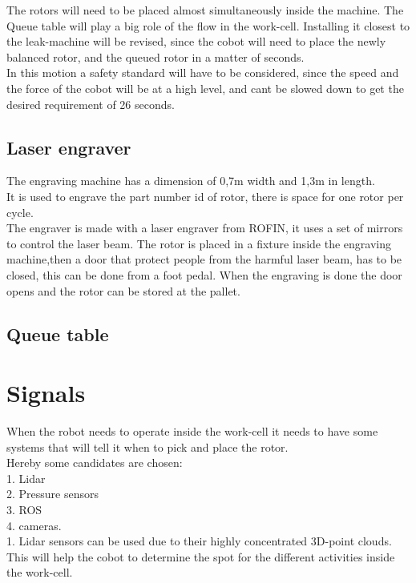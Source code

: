  The rotors will need to be placed almost simultaneously inside the machine. The Queue table will play a big role of the flow in the work-cell. Installing it closest to the leak-machine will be revised, since the cobot will need to place the newly balanced rotor, and the queued rotor in a matter of seconds.\\ 
 In this motion a safety standard will have to be considered, since the speed and the force of the cobot will be at a high level, and cant be slowed down to get the desired requirement of 26 seconds.\\
 
 \subsection{Laser engraver}
 The engraving machine has a dimension of 0,7m width and 1,3m in length.\\
 It is used to engrave the part number id of rotor, there is space for one rotor per cycle.\\
 The engraver is made with a laser engraver from ROFIN, it uses a set of mirrors to control the laser beam\cite{laser}. The rotor is placed in a fixture inside the engraving machine,then a door that protect people from the harmful laser beam, has to be closed, this can be done from a foot pedal. When the engraving is done the door opens and the rotor can be stored at the pallet.   
 \subsection{Queue table}
 
 \section{Signals}
 
 When the robot needs to operate inside the work-cell it needs to have some systems that will tell it when to pick and place the rotor.\\
 Hereby some candidates are chosen:\\
 1. Lidar\\
 2. Pressure sensors\\
 3. ROS\\
 4. cameras.\\
 
 1. Lidar sensors can be used due to their highly concentrated 3D-point clouds. This will help the cobot to determine the spot for the different activities inside the work-cell.\\
 
